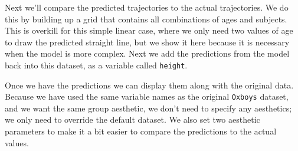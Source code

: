 \begin{Shaded}
\begin{Highlighting}[]
\NormalTok{>}\StringTok{ }\NormalTok{(}\NormalTok{)}
\NormalTok{>}\StringTok{ }\StringTok{ }\StringTok{ } 
\NormalTok{+}\StringTok{  } \NormalTok{~}\StringTok{ } \NormalTok{+}\StringTok{ }\StringTok{ }
\NormalTok{>}\StringTok{ }\StringTok{ } \StringTok{ }
\NormalTok{+}\StringTok{   }\NormalTok{()}
\end{Highlighting}
\end{Shaded}

Next we'll compare the predicted trajectories to the actual
trajectories. We do this by building up a grid that contains all
combinations of ages and subjects. This is overkill for this simple
linear case, where we only need two values of age to draw the predicted
straight line, but we show it here because it is necessary when the
model is more complex. Next we add the predictions from the model back
into this dataset, as a variable called \texttt{height}.

\begin{Shaded}
\begin{Highlighting}[]
\NormalTok{>}\StringTok{ }\StringTok{ }\NormalTok{(-}\NormalTok{, }\NormalTok{, } \NormalTok{)}
\NormalTok{>}\StringTok{ }\StringTok{ }
\NormalTok{>}\StringTok{ }
\ErrorTok{>}\StringTok{ }\StringTok{ }\NormalTok{(}  
\NormalTok{>}\StringTok{ }\StringTok{ }
\end{Highlighting}
\end{Shaded}

Once we have the predictions we can display them along with the original
data. Because we have used the same variable names as the original
\texttt{Oxboys} dataset, and we want the same group aesthetic, we don't
need to specify any aesthetics; we only need to override the default
dataset. We also set two aesthetic parameters to make it a bit easier to
compare the predictions to the actual values.


